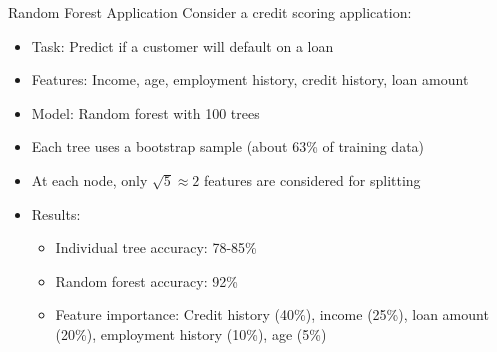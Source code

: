 \begin{example}{Random Forest Application}
Consider a credit scoring application:
\begin{itemize}
    \item Task: Predict if a customer will default on a loan
    \item Features: Income, age, employment history, credit history, loan amount
    \item Model: Random forest with 100 trees
    \item Each tree uses a bootstrap sample (about 63\% of training data)
    \item At each node, only $\sqrt{5} \approx 2$ features are considered for splitting
    \item Results:
    \begin{itemize}
        \item Individual tree accuracy: 78-85\%
        \item Random forest accuracy: 92\%
        \item Feature importance: Credit history (40\%), income (25\%), loan amount (20\%), employment history (10\%), age (5\%)
    \end{itemize}
\end{itemize}
\end{example}

